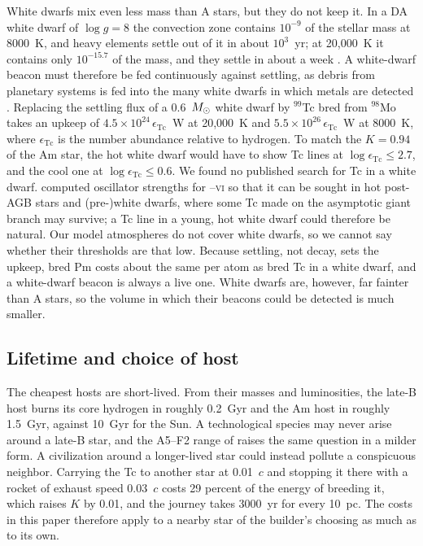 \documentclass[final,5p]{elsarticle}
\begin{document}
White dwarfs mix even less mass than A stars, but they do not keep it. In a DA white dwarf of $\log g = 8$ the convection zone contains $10^{-9}$ of the stellar mass at 8000~K, and heavy elements settle out of it in about $10^{3}$~yr; at 20{,}000~K it contains only $10^{-15.7}$ of the mass, and they settle in about a week \citep{Koester2009}. A white-dwarf beacon must therefore be fed continuously against settling, as debris from planetary systems is fed into the many white dwarfs in which metals are detected \citep{Koester2014}. Replacing the settling flux of a 0.6~$M_\odot$ white dwarf by $^{99}$Tc bred from $^{98}$Mo takes an upkeep of $4.5\times10^{24}\,\epsilon_\mathrm{Tc}$~W at 20{,}000~K and $5.5\times10^{26}\,\epsilon_\mathrm{Tc}$~W at 8000~K, where $\epsilon_\mathrm{Tc}$ is the number abundance relative to hydrogen. To match the $K = 0.94$ of the Am star, the hot white dwarf would have to show Tc lines at $\log\epsilon_\mathrm{Tc} \leq 2.7$, and the cool one at $\log\epsilon_\mathrm{Tc} \leq 0.6$. We found no published search for Tc in a white dwarf. \citet{Werner2015} computed oscillator strengths for --\textsc{vi} so that it can be sought in hot post-AGB stars and (pre-)white dwarfs, where some Tc made on the asymptotic giant branch may survive; a Tc line in a young, hot white dwarf could therefore be natural. Our model atmospheres do not cover white dwarfs, so we cannot say whether their thresholds are that low. Because settling, not decay, sets the upkeep, bred Pm costs about the same per atom as bred Tc in a white dwarf, and a white-dwarf beacon is always a live one. White dwarfs are, however, far fainter than A stars, so the volume in which their beacons could be detected is much smaller.

\subsection{Lifetime and choice of host}
\label{sec:choice}

The cheapest hosts are short-lived. From their masses and luminosities, the late-B host burns its core hydrogen in roughly 0.2~Gyr and the Am host in roughly 1.5~Gyr, against 10~Gyr for the Sun. A technological species may never arise around a late-B star, and the A5--F2 range of \citet{Whitmire1980} raises the same question in a milder form. A civilization around a longer-lived star could instead pollute a conspicuous neighbor. Carrying the Tc to another star at 0.01~$c$ and stopping it there with a rocket of exhaust speed 0.03~$c$ costs 29 percent of the energy of breeding it, which raises $K$ by 0.01, and the journey takes 3000~yr for every 10~pc. The costs in this paper therefore apply to a nearby star of the builder's choosing as much as to its own.
\end{document}
